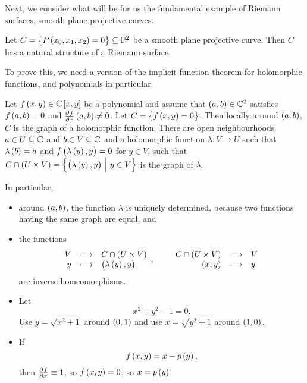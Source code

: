 Next, we consider what will be for us the fundamental example of Riemann surfaces, smooth plane projective curves.

\begin{lemma}
\label{lem:15.5}
Let $ C = \cbr{P\br{x_0, x_1, x_2} = 0} \subseteq \PP^2 $ be a smooth plane projective curve. Then $ C $ has a natural structure of a Riemann surface.
\end{lemma}

To prove this, we need a version of the implicit function theorem for holomorphic functions, and polynomials in particular.

\begin{theorem}
Let $ f\br{x, y} \in \CC\sbr{x, y} $ be a polynomial and assume that $ \br{a, b} \in \CC^2 $ satisfies $ f\br{a, b} = 0 $ and $ \tpd{f}{x}\br{a, b} \ne 0 $. Let $ C = \cbr{f\br{x, y} = 0} $. Then locally around $ \br{a, b} $, $ C $ is the graph of a holomorphic function. There are open neighbourhoods $ a \in U \subseteq \mathbb{C} $ and $ b \in V \subseteq \mathbb{C} $ and a holomorphic function $ \lambda : V \to U $ such that $ \lambda\br{b} = a $ and $ f\br{\lambda\br{y}, y} = 0 $ for $ y \in V $, such that $ C \cap \br{U \times V} = \cbr{\br{\lambda\br{y}, y} \st y \in V} $ is the graph of $ \lambda $.
\end{theorem}

\begin{note*}
In particular,
\begin{itemize}
\item around $ \br{a, b} $, the function $ \lambda $ is uniquely determined, because two functions having the same graph are equal, and
\item the functions
$$ \function{V}{C \cap \br{U \times V}}{y}{\br{\lambda\br{y}, y}}, \qquad \function{C \cap \br{U \times V}}{V}{\br{x, y}}{y} $$
are inverse homeomorphisms.
\end{itemize}
\end{note*}

\begin{example*}
\hfill
\begin{itemize}
\item Let
$$ x^2 + y^2 - 1 = 0. $$
Use $ y = \sqrt{x^2 + 1} $ around $ \br{0, 1} $ and use $ x = \sqrt{y^2 + 1} $ around $ \br{1, 0} $.
\item If
$$ f\br{x, y} = x - p\br{y}, $$
then $ \tpd{f}{x} \equiv 1 $, so $ f\br{x, y} = 0 $, so $ x = p\br{y} $.
\end{itemize}
\end{example*}

